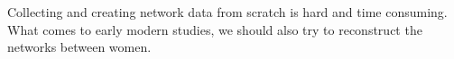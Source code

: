 \documentclass[a4paper,12pt]{article}
\begin{document}
Collecting and creating network data from scratch is hard and time consuming. 
What comes to early modern studies, we should also try to reconstruct the networks between women. 
	
\end{document}
